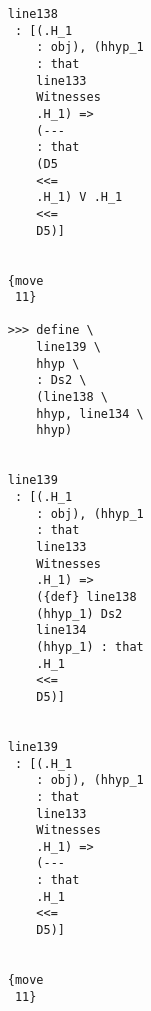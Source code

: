 \documentclass[12pt]{article}
\begin{document}
\begin{verbatim}
                                    line138 
                                     : [(.H_1 
                                        : obj), (hhyp_1 
                                        : that 
                                        line133 
                                        Witnesses 
                                        .H_1) => 
                                        (--- 
                                        : that 
                                        (D5 
                                        <<= 
                                        .H_1) V .H_1 
                                        <<= 
                                        D5)]


                                    {move 
                                     11}

                                    >>> define \
                                        line139 \
                                        hhyp \
                                        : Ds2 \
                                        (line138 \
                                        hhyp, line134 \
                                        hhyp)


                                    line139 
                                     : [(.H_1 
                                        : obj), (hhyp_1 
                                        : that 
                                        line133 
                                        Witnesses 
                                        .H_1) => 
                                        ({def} line138 
                                        (hhyp_1) Ds2 
                                        line134 
                                        (hhyp_1) : that 
                                        .H_1 
                                        <<= 
                                        D5)]


                                    line139 
                                     : [(.H_1 
                                        : obj), (hhyp_1 
                                        : that 
                                        line133 
                                        Witnesses 
                                        .H_1) => 
                                        (--- 
                                        : that 
                                        .H_1 
                                        <<= 
                                        D5)]


                                    {move 
                                     11}


\end{verbatim}
\end{document}
